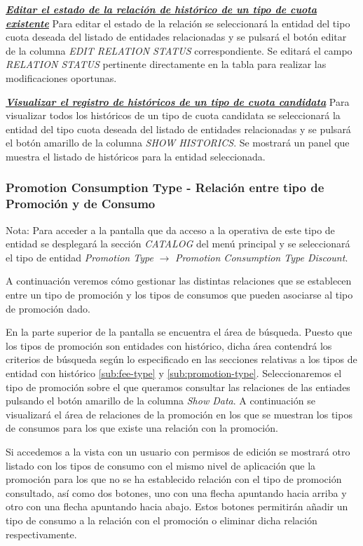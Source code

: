 \underline{\textsl{\textbf{Editar el estado de la relación de histórico de un tipo de cuota existente}}}
Para editar el estado de la relación se seleccionará la entidad del tipo cuota  deseada del listado de entidades relacionadas y se pulsará el botón editar de la columna \textit{EDIT RELATION STATUS} correspondiente. Se editará el campo \emph{RELATION STATUS} pertinente directamente en la tabla para realizar las modificaciones oportunas.

\underline{\textsl{\textbf{Visualizar el registro de históricos de un tipo de cuota candidata}}}
Para visualizar todos los históricos de un tipo de cuota candidata se seleccionará la entidad del tipo cuota deseada del listado de entidades relacionadas y se pulsará el botón amarillo de la columna \textit{SHOW HISTORICS}. Se mostrará un panel que muestra el listado de históricos para la entidad seleccionada. 





\subsubsection{Promotion Consumption Type - Relación entre tipo de Promoción y de Consumo}
\label{sub:promotion-consumption-type-relation}

Nota: Para acceder a la pantalla que da acceso a la operativa de este tipo de entidad se desplegará la sección \emph{CATALOG} del menú principal y se seleccionará el tipo de entidad \emph{Promotion Type} $\rightarrow$  \emph{Promotion Consumption Type Discount}.


A continuación veremos cómo gestionar las distintas relaciones que se establecen entre un tipo de promoción y los tipos de consumos que pueden asociarse al tipo de promoción dado.


En la parte superior de la pantalla se encuentra el área de búsqueda. Puesto que los tipos de promoción son entidades con histórico, dicha área contendrá los criterios de búsqueda según lo especificado en las secciones relativas a los tipos de entidad con histórico \ref{sub:fee-type} y \ref{sub:promotion-type}. 
Seleccionaremos el tipo de promoción sobre el que queramos consultar las relaciones de las entiades pulsando el botón amarillo de la columna \emph{Show Data}. A continuación se visualizará el área de relaciones de la promoción en los que se muestran los tipos de consumos para los que existe una relación con la promoción.


Si accedemos a la vista con un usuario con permisos de edición se mostrará otro listado con los tipos de consumo con el mismo nivel de aplicación que la promoción para los que no se ha establecido relación con el tipo de promoción consultado, así como dos botones, uno con una flecha apuntando hacia arriba y otro con una flecha apuntando hacia abajo. Estos botones permitirán añadir un tipo de consumo a la relación con el promoción o eliminar dicha relación respectivamente. 

